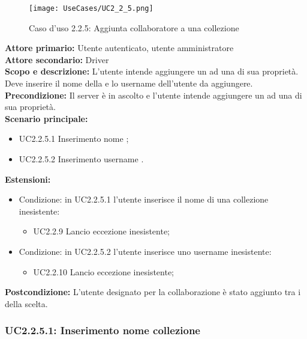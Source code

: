 \documentclass{scalatekids-article}
\begin{document}
\begin{figure}[H]
  \begin{center}
    \texttt{[image: UseCases/UC2\_2\_5.png]}
    \caption*{Caso d'uso 2.2.5: Aggiunta collaboratore a una collezione}
  \end{center}
\end{figure}
\textbf{Attore primario:} Utente autenticato, utente amministratore\\
\textbf{Attore secondario:} Driver\\
\textbf{Scopo e descrizione:} L'utente intende aggiungere un  ad una  di sua proprietà. Deve inserire il nome della  e lo username dell'utente da aggiungere.\\
\textbf{Precondizione:} Il server è in ascolto e l'utente intende aggiungere un  ad una  di sua proprietà.\\
\textbf{Scenario principale:}
\begin{itemize}
\item UC2.2.5.1 Inserimento nome ;
\item UC2.2.5.2 Inserimento username .
\end{itemize}
\textbf{Estensioni:}
\begin{itemize}
\item Condizione: in UC2.2.5.1 l'utente inserisce il nome di una collezione inesistente:
  \begin{itemize}
  \item UC2.2.9 Lancio eccezione  inesistente;
  \end{itemize}
\item Condizione: in UC2.2.5.2 l'utente inserisce uno username inesistente:
  \begin{itemize}
  \item UC2.2.10 Lancio eccezione  inesistente;
  \end{itemize}
\end{itemize}
\textbf{Postcondizione:} L'utente designato per la collaborazione è stato aggiunto tra i  della  scelta.

\subsubsection{UC2.2.5.1: Inserimento nome collezione}
\end{document}
